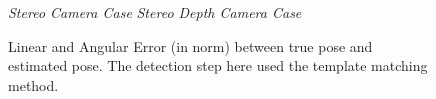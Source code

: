 \begin{figure}
	\hspace*{20px}\textit{Stereo Camera Case} \hspace{75px} \textit{Stereo Depth Camera Case}\\
	\vspace{30px}
	\caption[Tracking error plots with template matching detection initialization]{Linear and Angular Error (in norm) between true pose and estimated pose. The detection step here used the template matching method.}
	\label{fig:templateErrors}
\end{figure}